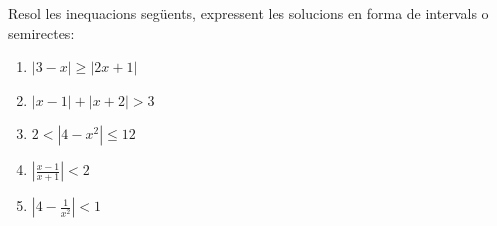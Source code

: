 \begin{exercici}
Resol les inequacions següents, expressent les solucions en forma de
intervals o semirectes:

\begin{enumerate}
\item[a)] $\left\vert 3-x\right\vert \geq \left\vert 2x+1\right\vert $

\item[b)] $\left\vert x-1\right\vert +\left\vert x+2\right\vert >3$

\item[c)] $2<\left\vert 4-x^{2}\right\vert \leq 12$

\item[d)] $\left\vert \frac{x-1}{x+1}\right\vert <2$

\item[e)] $\left\vert 4-\frac{1}{x^{2}}\right\vert <1$
\end{enumerate}

\end{exercici}

